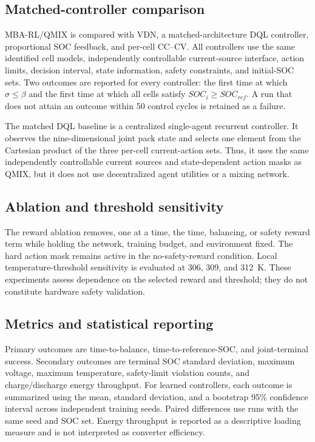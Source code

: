 \subsection{Matched-controller comparison}

MBA-RL/QMIX is compared with VDN, a matched-architecture DQL controller,
proportional SOC feedback, and per-cell CC--CV. All controllers use the same
identified cell models, independently controllable current-source interface,
action limits, decision interval, state information, safety constraints, and
initial-SOC sets. Two outcomes are reported for every controller: the first time
at which $\sigma\leq\beta$ and the first time at which all cells satisfy
$SOC_i\geq SOC_{ref}$. A run that does not attain an outcome within 50 control
cycles is retained as a failure.

The matched DQL baseline is a centralized single-agent recurrent controller.
It observes the nine-dimensional joint pack state and selects one element from
the Cartesian product of the three per-cell current-action sets. Thus, it uses
the same independently controllable current sources and state-dependent action
masks as QMIX, but it does not use decentralized agent utilities or a mixing
network.

\subsection{Ablation and threshold sensitivity}

The reward ablation removes, one at a time, the time, balancing, or safety reward
term while holding the network, training budget, and environment fixed. The
hard action mask remains active in the no-safety-reward condition. Local
temperature-threshold sensitivity is evaluated at 306, 309, and 312~K. These
experiments assess dependence on the selected reward and threshold; they do not
constitute hardware safety validation.

\subsection{Metrics and statistical reporting}

Primary outcomes are time-to-balance, time-to-reference-SOC, and joint-terminal
success. Secondary outcomes are terminal SOC standard deviation, maximum
voltage, maximum temperature, safety-limit violation counts, and charge/discharge
energy throughput. For learned controllers, each outcome is summarized using
the mean, standard deviation, and a bootstrap 95\% confidence interval across
independent training seeds. Paired differences use runs with the same seed and
SOC set. Energy throughput is reported as a descriptive loading measure and is
not interpreted as converter efficiency.

